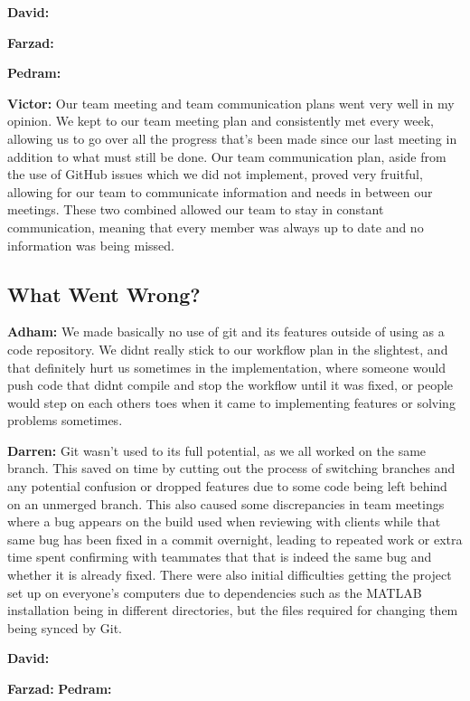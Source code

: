 \documentclass{article}
\begin{document}
\textbf{David:}

\textbf{Farzad:}

\textbf{Pedram:}

\textbf{Victor:} Our team meeting and team communication plans went very well in my opinion. We kept to our team meeting plan and consistently met every week, 
allowing us to go over all the progress that's been made since our last meeting in addition to what must still be done. Our team communication plan, aside from the use of 
GitHub issues which we did not implement, proved very fruitful, allowing for our team to communicate information and needs in between our meetings. These two combined allowed 
our team to stay in constant communication, meaning that every member was always up to date and no information was being missed.

\subsection{What Went Wrong?}

\textbf{Adham:} We made basically no use of git and its features outside of using as a code repository. We didnt really stick to our workflow plan in the slightest, and that
definitely hurt us sometimes in the implementation, where someone would push code that didnt compile and stop the workflow until it was fixed, or people would step on each others
toes when it came to implementing features or solving problems sometimes.

\textbf{Darren:} Git wasn't used to its full potential, as we all worked on the same branch. This saved on time by cutting out the process of switching branches and any potential confusion or dropped features due to some code being left behind on an unmerged branch. This also caused some discrepancies in team meetings where a bug appears on the build used when reviewing with clients while that same bug has been fixed in a commit overnight, leading to repeated work or extra time spent confirming with teammates that that is indeed the same bug and whether it is already fixed. There were also initial difficulties getting the project set up on everyone's computers due to dependencies such as the MATLAB installation being in different directories, but the files required for changing them being synced by Git.

\textbf{David:}

\textbf{Farzad:}
\textbf{Pedram:}
\end{document}
